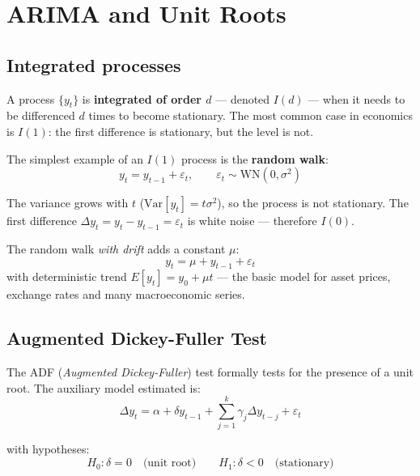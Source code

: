 \chapter{ARIMA and Unit Roots}
\label{cap:arima}

\section{Integrated processes}

A process $\{y_t\}$ is \textbf{integrated of order $d$} --- denoted $I(d)$
--- when it needs to be differenced $d$ times to become stationary.
The most common case in economics is $I(1)$: the first difference is stationary,
but the level is not.

The simplest example of an $I(1)$ process is the \textbf{random walk}:
\[
  y_t = y_{t-1} + \varepsilon_t, \qquad \varepsilon_t \sim \mathrm{WN}(0, \sigma^2)
\]

The variance grows with $t$ ($\mathrm{Var}[y_t] = t\sigma^2$), so the
process is not stationary. The first difference $\Delta y_t = y_t -
y_{t-1} = \varepsilon_t$ is white noise --- therefore $I(0)$.

The random walk \emph{with drift} adds a constant $\mu$:
\[
  y_t = \mu + y_{t-1} + \varepsilon_t
\]
with deterministic trend $E[y_t] = y_0 + \mu t$ --- the basic model for
asset prices, exchange rates and many macroeconomic series.

\section{Augmented Dickey-Fuller Test}

The ADF (\emph{Augmented Dickey-Fuller}) test formally tests for the presence of
a unit root. The auxiliary model estimated is:
\[
  \Delta y_t = \alpha + \delta y_{t-1}
               + \sum_{j=1}^{k} \gamma_j \Delta y_{t-j} + \varepsilon_t
\]

with hypotheses:
\[
  H_0: \delta = 0 \quad \text{(unit root)} \qquad
  H_1: \delta < 0 \quad \text{(stationary)}
\]

